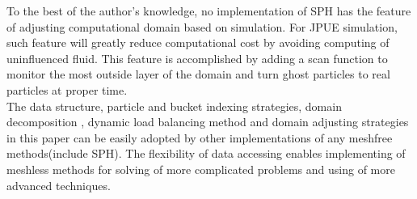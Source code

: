 \documentclass[conference,compsoc]{IEEEtran}
\begin{document}
To the best of the author's knowledge, no implementation of SPH has the feature of adjusting computational domain based on simulation. For JPUE simulation, such feature will greatly reduce computational cost by avoiding computing of uninfluenced fluid. This feature is accomplished by adding a scan function to monitor the most outside layer of the domain and turn ghost particles to real particles at proper time. 
\\
The data structure, particle and bucket indexing strategies, domain decomposition , dynamic load balancing method and domain adjusting strategies in this paper can be easily adopted by other implementations of any meshfree methods(include SPH). The flexibility of data accessing enables implementing of meshless methods for solving of more complicated problems and using of more advanced techniques.\\
\end{document}
